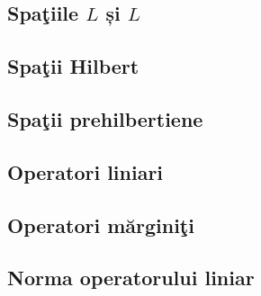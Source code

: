 \documentclass[a4paper,12pt]{article}
\theoremstyle{change}
\begin{document}
\subsection{Spaţiile $L$ și $L$}


\subsection{Spaţii  Hilbert}

\subsection{Spaţii prehilbertiene}


\subsection{Operatori liniari}

\subsection{Operatori mărginiţi}


\subsection{Norma operatorului liniar}
\end{document}
